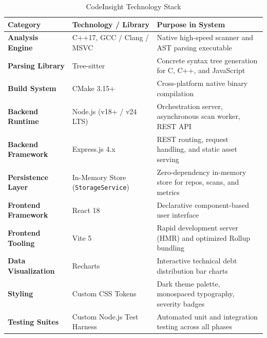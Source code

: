 \begin{table}[htbp]
\centering
\caption{CodeInsight Technology Stack}
\label{tab:tech_stack}
\vspace{0.3cm}
\begin{tabularx}{\textwidth}{>{\raggedright\arraybackslash}p{4.55cm}>{\raggedright\arraybackslash}p{5.05cm}>{\raggedright\arraybackslash}X}
\toprule
\textbf{Category} & \textbf{Technology / Library} & \textbf{Purpose in System} \\
\midrule
\textbf{Analysis Engine} & C++17, GCC / Clang / MSVC & Native high-speed scanner and AST parsing executable \\
\addlinespace[0.25cm]
\textbf{Parsing Library} & Tree-sitter & Concrete syntax tree generation for C, C++, and JavaScript \\
\addlinespace[0.25cm]
\textbf{Build System} & CMake 3.15+ & Cross-platform native binary compilation \\
\addlinespace[0.25cm]
\textbf{Backend Runtime} & Node.js (v18+ / v24 LTS) & Orchestration server, asynchronous scan worker, REST API \\
\addlinespace[0.25cm]
\textbf{Backend Framework} & Express.js 4.x & REST routing, request handling, and static asset serving \\
\addlinespace[0.25cm]
\textbf{Persistence Layer} & In-Memory Store (\texttt{StorageService}) & Zero-dependency in-memory store for repos, scans, and metrics \\
\addlinespace[0.25cm]
\textbf{Frontend Framework} & React 18 & Declarative component-based user interface \\
\addlinespace[0.25cm]
\textbf{Frontend Tooling} & Vite 5 & Rapid development server (HMR) and optimized Rollup bundling \\
\addlinespace[0.25cm]
\textbf{Data Visualization} & Recharts & Interactive technical debt distribution bar charts \\
\addlinespace[0.25cm]
\textbf{Styling} & Custom CSS Tokens & Dark theme palette, monospaced typography, severity badges \\
\addlinespace[0.25cm]
\textbf{Testing Suites} & Custom Node.js Test Harness & Automated unit and integration testing across all phases \\
\bottomrule
\end{tabularx}
\end{table}

